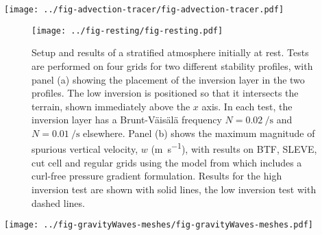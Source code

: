 \documentclass{ametsoc}
\begin{document}
\begin{figure*}
	\centering
	\texttt{[image: ../fig-advection-tracer/fig-advection-tracer.pdf]}
%
	\caption{Tracer contours advected in a terrain following velocity field at \(t = \SI{0}{\second}\), \SI{5000}{\second} and \SI{10000}{\second} using the centred linear scheme on (a) the BTF grid, and (b) the cut cell grid with contour intervals every 0.1.  Errors at \(t = \SI{10000}{\second}\) are shown for (c) the the centred linear scheme on the BTF grid, (d) the centred linear scheme on the cut cell grid, (e) the upwind-biased cubic scheme on the BTF grid, and (f) the upwind-biased cubic scheme on the cut cell grid with contour intervals every 0.01.  Negative contours denoted by dotted lines.  The terrain profile is also shown immediately above the $x$ axis.}
	\label{fig:advection-tracer}
\end{figure*}

\begin{figure}
	\centering
	\texttt{[image: ../fig-resting/fig-resting.pdf]}
%
	\caption{Setup and results of a stratified atmosphere initially at rest.  Tests are performed on four grids for two different stability profiles, with panel (a) showing the placement of the inversion layer in the two profiles.
The low inversion is positioned so that it intersects the terrain, shown immediately above the $x$ axis.
In each test, the inversion layer has a Brunt-V\"ais\"al\"a frequency $N = \SI{0.02}{\per\second}$ and $N = \SI{0.01}{\per\second}$ elsewhere.  
Panel (b) shows the maximum magnitude of spurious vertical velocity, \(w\) (\si{\meter\per\second}), with results on BTF, SLEVE, cut cell and regular grids using the model from \citet{weller-shahrokhi2014} which includes a curl-free pressure gradient formulation.
Results for the high inversion test are shown with solid lines, the low inversion test with dashed lines.}
	\label{fig:resting}
\end{figure}

\begin{figure*}
	\centering
	\texttt{[image: ../fig-gravityWaves-meshes/fig-gravityWaves-meshes.pdf]}
	\caption{Cut cell grids used for the gravity waves and thermal advection tests at (a) $\Delta z = \SI{300}{\meter}$, (b) $\Delta z = \SI{250}{\meter}$, and (c) $\Delta z = \SI{200}{\meter}$.  The mountain peak $h_0 = \SI{250}{\meter}$.  At $\Delta z = \SI{250}{\meter}$, the grid creation process has merged small cells with the cells in the layer above but, at $\Delta z = \SI{200}{\meter}$, small cells have been retained.  The full two dimensional grids are \SI{300}{\kilo\meter} wide and \SI{30}{\kilo\meter} high.  Axes are in units of \si{\meter}.}
	\label{fig:gw-meshes}
\end{figure*}
\end{document}
